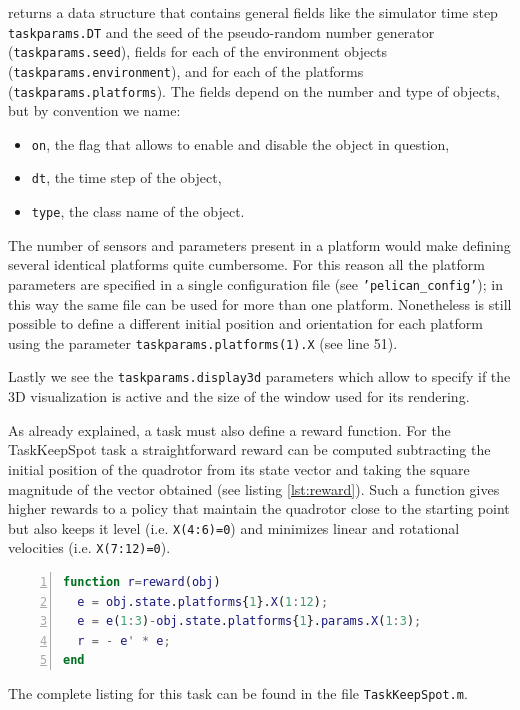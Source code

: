 \documentclass[a4paper,11pt]{report}
\begin{document}
returns a data structure that contains general fields like the simulator time step \texttt{taskparams.DT} and the seed of the pseudo-random number generator (\texttt{taskparams.seed}), fields for each of the environment objects (\texttt{taskparams.environment}), and for each of the platforms (\texttt{taskparams.platforms}). The fields depend on the number and type of objects, but by convention we name:
\begin{itemize}
\item \texttt{on}, the flag that allows to enable and disable the object in question,
\item \texttt{dt}, the time step of the object,
\item \texttt{type}, the class name of the object.
\end{itemize}

The number of sensors and parameters present in a platform would make defining several identical platforms quite cumbersome. For this reason all the platform parameters are specified in a single configuration file (see \texttt{'pelican\_config'}); in this way the same file can be used for more than one platform. Nonetheless is still possible to define a different initial position and orientation for each platform using the parameter \texttt{taskparams.platforms(1).X} (see line 51).

Lastly we see the \texttt{taskparams.display3d} parameters which allow to specify if the 3D visualization is active and the size of the window used for its rendering. 

As already explained, a task must also define a reward function. For the TaskKeepSpot task a straightforward reward can be computed subtracting the initial position of the quadrotor from its state vector and taking the square magnitude of the vector obtained (see listing \ref{lst:reward}). 
Such a function gives higher rewards to a policy that maintain the quadrotor close to the starting point but also keeps it level (i.e. \texttt{X(4:6)=0}) and minimizes linear and rotational velocities (i.e. \texttt{X(7:12)=0}).

\begin{lstlisting}[float=ht!bp,caption=TaskKeepSpot reward() method,language=Matlab,frame=lines,label=lst:reward,numbers=left,basicstyle=\small]
function r=reward(obj)
  e = obj.state.platforms{1}.X(1:12);
  e = e(1:3)-obj.state.platforms{1}.params.X(1:3);
  r = - e' * e; 
end
\end{lstlisting}
The complete listing for this task can be found in the file \texttt{TaskKeepSpot.m}.  
\end{document}
